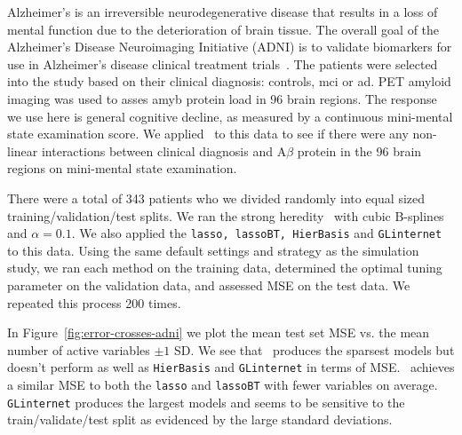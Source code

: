 
Alzheimer's is an irreversible neurodegenerative disease that results in a loss of mental function due to the deterioration of brain tissue. The overall goal of the Alzheimer's Disease Neuroimaging Initiative (ADNI) is to validate biomarkers for use in
Alzheimer's disease clinical treatment trials~\citep{petersen2010alzheimer}. The patients were selected into the study based on their clinical diagnosis: controls, \ac{mci} or \ac{ad}. PET amyloid imaging was used to asses \ac{amyb} protein load in 96 brain regions. The response we use here is general cognitive decline, as measured by a continuous mini-mental state examination score. We applied \sail ~to this data to see if there were any non-linear interactions between clinical diagnosis and A$\beta$ protein in the 96 brain regions on mini-mental state examination. 

There were a total of 343 patients who we divided randomly into equal sized training/validation/test splits. We ran the strong heredity \sail ~with cubic B-splines and $\alpha=0.1$. We also applied the \texttt{lasso, lassoBT, HierBasis} and \texttt{GLinternet} to this data. Using the same default settings and strategy as the simulation study, we ran each method on the training data, determined the optimal tuning parameter on the validation data, and assessed MSE on the test data. We repeated this process 200 times. 



In Figure~\ref{fig:error-crosses-adni} we plot the mean test set MSE vs. the mean number of active variables $\pm 1$ SD. We see that \sail ~produces the sparsest models but doesn't perform as well as \texttt{HierBasis} and \texttt{GLinternet} in terms of MSE. \sail ~achieves a similar MSE to both the \texttt{lasso} and \texttt{lassoBT} with fewer variables on average. \texttt{GLinternet} produces the largest models and seems to be sensitive to the train/validate/test split as evidenced by the large standard deviations. 

